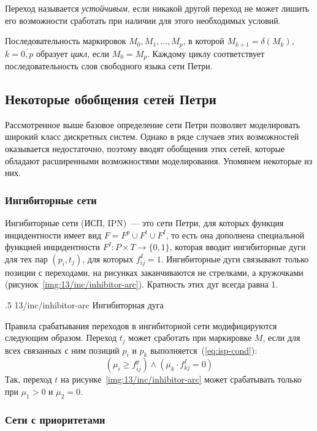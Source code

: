 Переход называется \textit{устойчивым}, если никакой другой переход не может лишить его возможности сработать при наличии для этого необходимых условий.

Последовательность маркировок ${M_0, M_1, \dots, M_p}$, в которой ${M_{k + 1} = \delta(M_k)}$, ${k = \overline{0, p}}$ образует \textit{цикл}, если ${M_0 = M_p}$. Каждому циклу соответствует последовательность слов свободного языка сети Петри.

\subsection{Некоторые обобщения сетей Петри}

Рассмотренное выше базовое определение сети Петри позволяет моделировать широкий класс дискретных систем. Однако в ряде случаев этих возможностей оказывается недостаточно, поэтому вводят обобщения этих сетей, которые обладают расширенными возможностями моделирования. Упомянем некоторые из них.

\subsubsection{Ингибиторные сети}

Ингибиторные сети (ИСП, IPN)~--- это сети Петри, для которых функция инцидентности имеет вид ${F = F^p\cup F^t\cup F^I}$, то есть она дополнена специальной функцией инцидентности ${F^I\colon P\times T\rightarrow \{ 0, 1 \}}$, которая вводит ингибиторные дуги для тех пар ${(p_i, t_j)}$, для которых ${f_{ij}^I = 1}$. Ингибиторные дуги связывают только позиции с переходами, на рисунках заканчиваются не стрелками, а кружочками (рисунок~\ref{img:13/inc/inhibitor-arc}). Кратность этих дуг всегда равна 1.

\image
{.5\textwidth}
{13/inc/inhibitor-arc}
{Ингибиторная дуга}

Правила срабатывания переходов в ингибиторной сети модифицируются следующим образом. Переход $t_j$ может сработать при маркировке $M$, если для всех связанных с ним позиций $p_i$ и $p_k$ выполняется~(\ref{eq:isp-cond}):
%
\begin{equation}
    \label{eq:isp-cond}
    (\mu_i\geqslant f_{ij}^p)\wedge(\mu_k\cdot f_{kj}^I = 0)
\end{equation}
%
Так, переход $t$ на рисунке~\ref{img:13/inc/inhibitor-arc} может срабатывать только при ${\mu_1 > 0}$ и ${\mu_2 = 0}$.

\subsubsection{Сети с приоритетами}

